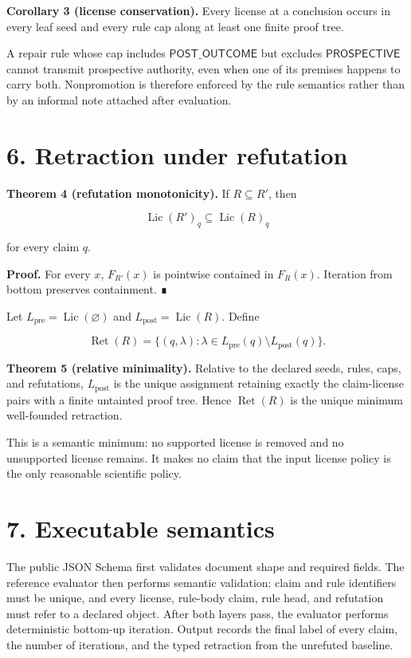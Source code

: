 \documentclass[
  11pt,
]{article}
\begin{document}
\textbf{Corollary 3 (license conservation).} Every license at a
conclusion occurs in every leaf seed and every rule cap along at least
one finite proof tree.

A repair rule whose cap includes \(\textsf{POST\_OUTCOME}\) but excludes
\(\textsf{PROSPECTIVE}\) cannot transmit prospective authority, even
when one of its premises happens to carry both. Nonpromotion is
therefore enforced by the rule semantics rather than by an informal note
attached after evaluation.

\hypertarget{retraction-under-refutation}{%
\section{6. Retraction under
refutation}\label{retraction-under-refutation}}

\textbf{Theorem 4 (refutation monotonicity).} If \(R\subseteq R'\), then

\[
\operatorname{Lic}(R')_q\subseteq\operatorname{Lic}(R)_q
\]

for every claim \(q\).

\textbf{Proof.} For every \(x\), \(F_{R'}(x)\) is pointwise contained in
\(F_R(x)\). Iteration from bottom preserves containment. ∎

Let \(L_{\mathrm{pre}}=\operatorname{Lic}(\varnothing)\) and
\(L_{\mathrm{post}}=\operatorname{Lic}(R)\). Define

\[
\operatorname{Ret}(R)
=\{(q, \lambda):
\lambda\in L_{\mathrm{pre}}(q)\setminus L_{\mathrm{post}}(q)\}.
\]

\textbf{Theorem 5 (relative minimality).} Relative to the declared
seeds, rules, caps, and refutations, \(L_{\mathrm{post}}\) is the unique
assignment retaining exactly the claim-license pairs with a finite
untainted proof tree. Hence \(\operatorname{Ret}(R)\) is the unique
minimum well-founded retraction.

This is a semantic minimum: no supported license is removed and no
unsupported license remains. It makes no claim that the input license
policy is the only reasonable scientific policy.

\hypertarget{executable-semantics}{%
\section{7. Executable semantics}\label{executable-semantics}}

The public JSON Schema first validates document shape and required
fields. The reference evaluator then performs semantic validation: claim
and rule identifiers must be unique, and every license, rule-body claim,
rule head, and refutation must refer to a declared object. After both
layers pass, the evaluator performs deterministic bottom-up iteration.
Output records the final label of every claim, the number of iterations,
and the typed retraction from the unrefuted baseline.
\end{document}

